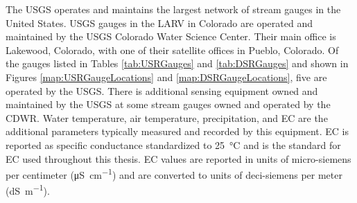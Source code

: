 The USGS operates and maintains the largest network of stream gauges in the United States.  USGS gauges in the LARV in Colorado are operated and maintained by the USGS Colorado Water Science Center.  Their main office is Lakewood, Colorado, with one of their satellite offices in Pueblo, Colorado.  Of the gauges listed in Tables \ref{tab:USRGauges} and \ref{tab:DSRGauges} and shown in Figures \ref{map:USRGaugeLocations} and \ref{map:DSRGaugeLocations}, five are operated by the USGS.  There is additional sensing equipment owned and maintained by the USGS at some stream gauges owned and operated by the CDWR.  Water temperature, air temperature, precipitation, and EC are the additional parameters typically measured and recorded by this equipment.  EC is reported as specific conductance standardized to \SI{25}{\degreeCelsius} and is the standard for EC used throughout this thesis.  EC values are reported in units of micro-siemens per centimeter (\si{\micro\siemens\per\centi\meter}) and are converted to units of deci-siemens per meter (\si{\deci\siemens\per\meter}).


